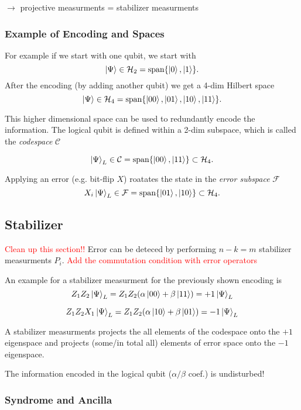 $\rightarrow$ projective measurments = stabilizer measurments

\subsubsection{Example of Encoding and Spaces}
For example if we start with one qubit, we start with 
\begin{equation}
    \ket{\Psi} \in \mathcal{H}_2 = \text{span}\{\ket{0},\ket{1} \}.
\end{equation}
After the encoding (by adding another qubit) we get a 4-dim Hilbert space 
\begin{equation}
    \ket{\Psi} \in \mathcal{H}_4 = \text{span}\{\ket{00},\ket{01},\ket{10},\ket{11} \}.
\end{equation}

This higher dimensional space can be used to redundantly encode the information.
The logical qubit is defined within a 2-dim subspace, which is called the \textit{codespace} $\mathcal{C}$

\begin{equation}
    \ket{\Psi}_L \in \mathcal{C} = \text{span}\{\ket{00},\ket{11} \} \subset \mathcal{H}_4.
\end{equation}

Applying an error (e.g. bit-flip $X$) roatates the state in the \textit{error subspace} $\mathcal{F}$
\begin{equation}
    X_i \ket{\Psi}_L \in \mathcal{F} = \text{span}\{\ket{01},\ket{10} \} \subset \mathcal{H}_4.
\end{equation} 


\subsection{Stabilizer}
\textcolor{red}{Clean up this section!!}
Error can be deteced by performing $n-k=m$ stabilizer measurments $P_i$.
\textcolor{red}{Add the commutation condition with error operators}

An example for a stabilizer measurment for the previously shown encoding is 
\begin{equation}
    Z_1 Z_2 \ket{\Psi}_L = Z_1 Z_2 (\alpha \ket{00}+ \beta \ket{11}) = +1 \ket{\Psi}_L
\end{equation}

\begin{equation}
    Z_1 Z_2 X_1\ket{\Psi}_L = Z_1 Z_2 (\alpha \ket{10}+ \beta \ket{01}) = -1 \ket{\Psi}_L
\end{equation}

A stabilizer measurments projects the all elements of the codespace onto the $+1$ eigenspace 
and projects (some/in total all) elements of error space onto the $-1$ eigenspace. 

The information encoded in the logical qubit ($\alpha/\beta$ coef.) is undisturbed!

\subsubsection{Syndrome and Ancilla}
